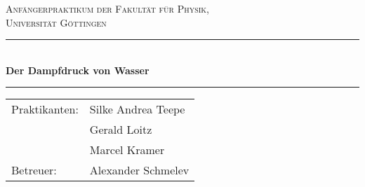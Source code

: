\begin{titlepage}
\centering
\textsc{\Large Anfängerpraktikum der Fakultät für
  Physik,\\[1.5ex] Universität Göttingen}

\vspace*{4.2cm}

\rule{\textwidth}{1pt}\\[0.5cm]
{\huge \bfseries
  Der Dampfdruck von Wasser}\\[0.5cm]
\rule{\textwidth}{1pt}

\vspace*{3.5cm}

\begin{Large}
\begin{tabular}{ll}
Praktikanten: &  Silke Andrea Teepe\\
& Gerald Loitz \\
& Marcel Kramer\\
Betreuer: & Alexander Schmelev\\
\end{tabular}
\end{Large}

\vspace*{0.8cm}

\begin{Large}
\end{Large}

\end{titlepage}